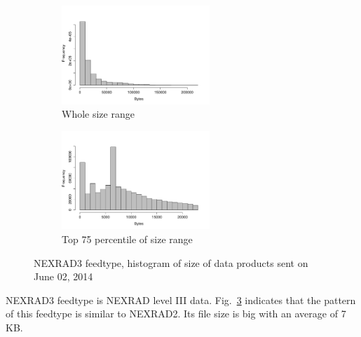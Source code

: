\begin{figure}[htb!]
\centering
    \begin{subfigure}{0.5\linewidth}
        \centering
        \includegraphics[width=2.2in]{figures/size-hist-NEXRAD30602.pdf}
        \caption{Whole size range}
        \label{NEXRAD3_Size_Whole}
    \end{subfigure}\hfill
    \begin{subfigure}{0.5\linewidth}
	\centering
    \includegraphics[width=2.2in]{figures/size-hist-NEXRAD30602-TOP75.pdf}
        \caption{Top 75 percentile of size range}
        \label{NEXRAD3_Size_75}
    \end{subfigure}\hfill
    \caption{NEXRAD3 feedtype, histogram of size of data products sent on June 02, 2014}
    \label{NEXRAD3_Size}
\end{figure}

NEXRAD3 \cite{NEXRAD3} feedtype is NEXRAD level III data. Fig.~\ref{NEXRAD3_Size} indicates that the pattern of this feedtype is similar to NEXRAD2. Its file size is big with an average of 7 KB.

